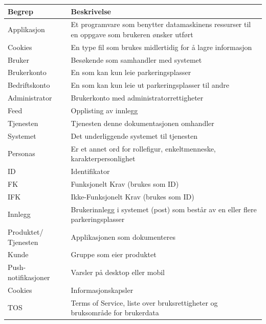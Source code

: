 \documentclass[12pt]{article}
\begin{document}
\begin{center}
    \begin{tabular}{|p{4cm}|p{12cm}|} 
        \hline
        \bf Begrep & \bf Beskrivelse\\
        \hline
        Applikasjon &  Et programvare som benytter datamaskinens ressurser til en oppgave som brukeren ønsker utført\\
        \hline
        Cookies & En type fil som brukes midlertidig for å lagre informasjon\\
        \hline
        Bruker & Besøkende som samhandler med systemet\\
        \hline
        Brukerkonto & En som kan kun leie parkeringsplasser\\
        \hline
        Bedriftskonto & En som kan kun leie ut parkeringsplasser til andre\\
        \hline
        Administrator & Brukerkonto med administratorrettigheter\\
        \hline
        Feed & Opplisting av innlegg\\
        \hline
        Tjenesten & Tjenesten denne dokumentasjonen omhandler\\
        \hline
        Systemet & Det underliggende systemet til tjenesten\\
        \hline
        Personas & Er et annet ord for rollefigur, enkeltmenneske, karakterpersonlighet\\
        \hline
        ID & Identifikator\\
        \hline
        FK & Funksjonelt Krav (brukes som ID)\\
        \hline
        IFK & Ikke-Funksjonelt Krav (brukes som ID)\\
        \hline
        Innlegg & Brukerinnlegg i systemet (post) som består av en eller flere parkeringsplasser\\
        \hline
        Produktet/ Tjenesten & Applikasjonen som dokumenteres\\
        \hline
        Kunde & Gruppe som eier produktet\\
        \hline
        Push-notifikasjoner & Varsler på desktop eller mobil \\
        \hline
        Cookies & Informasjonskapsler \\
        \hline
        TOS & Terms of Service, liste over bruksrettigheter og bruksområde for brukerdata \\
        \hline
    \end{tabular}
\end{center}
\end{document}
